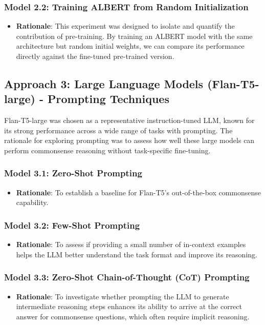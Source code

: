 \documentclass[10.5pt]{article}
\begin{document}
\subsubsection{Model 2.2: Training ALBERT from Random Initialization}
\begin{itemize}
    \item \textbf{Rationale}: This experiment was designed to isolate and quantify the contribution of pre-training. By training an ALBERT model with the same architecture but random initial weights, we can compare its performance directly against the fine-tuned pre-trained version.
\end{itemize}

\subsection{Approach 3: Large Language Models (Flan-T5-large) - Prompting Techniques}
Flan-T5-large was chosen as a representative instruction-tuned LLM, known for its strong performance across a wide range of tasks with prompting. The rationale for exploring prompting was to assess how well these large models can perform commonsense reasoning without task-specific fine-tuning.
\subsubsection{Model 3.1: Zero-Shot Prompting}
\begin{itemize}
    \item \textbf{Rationale}: To establish a baseline for Flan-T5's out-of-the-box commonsense capability.
\end{itemize}
\subsubsection{Model 3.2: Few-Shot Prompting}
\begin{itemize}
    \item \textbf{Rationale}: To assess if providing a small number of in-context examples helps the LLM better understand the task format and improve its reasoning.
\end{itemize}
\subsubsection{Model 3.3: Zero-Shot Chain-of-Thought (CoT) Prompting}
\begin{itemize}
    \item \textbf{Rationale}: To investigate whether prompting the LLM to generate intermediate reasoning steps enhances its ability to arrive at the correct answer for commonsense questions, which often require implicit reasoning.
\end{itemize}
\end{document}
